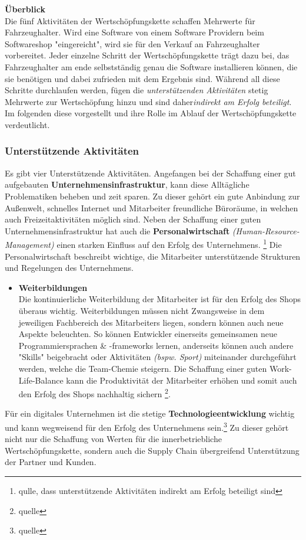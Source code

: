 \textbf{Überblick}\\
Die fünf Aktivitäten der Wertschöpfungskette schaffen Mehrwerte für Fahrzeughalter. Wird eine Software von einem Software Providern beim Softwareshop "eingereicht", wird sie für den Verkauf an Fahrzeughalter vorbereitet. Jeder einzelne Schritt der Wertschöpfungskette trägt dazu bei, das Fahrzeughalter am ende selbstständig genau die Software installieren können, die sie benötigen und dabei zufrieden mit dem Ergebnis sind. Während all diese Schritte durchlaufen werden, fügen die \textit{unterstützenden Aktivitäten} stetig Mehrwerte zur Wertschöpfung hinzu und sind daher\textit{indirekt am Erfolg beteiligt}. Im folgenden diese vorgestellt und ihre Rolle im Ablauf der Wertschöpfungskette verdeutlicht.

\subsubsection{Unterstützende Aktivitäten}\label{unterstd_activities}
Es gibt vier Unterstützende Aktivitäten. Angefangen bei der Schaffung einer gut aufgebauten \textbf{Unternehmensinfrastruktur}, kann diese Alltägliche Problematiken beheben und zeit sparen. Zu dieser gehört ein gute Anbindung zur Außenwelt, schnelles Internet und Mitarbeiter freundliche Büroräume, in welchen auch Freizeitaktivitäten möglich sind. Neben der Schaffung einer guten Unternehmensinfrastruktur hat auch die \textbf{Personalwirtschaft} \textit{(Human-Resource-Management)} einen starken Einfluss auf den Erfolg des Unternehmens. \footnote{qulle, dass unterstützende Aktivitäten indirekt am Erfolg beteiligt sind} Die Personalwirtschaft beschreibt wichtige, die Mitarbeiter unterstützende Strukturen und Regelungen des Unternehmens.
\begin{itemize}
	\item[] \hspace{-0.6cm} \textbf{Weiterbildungen}\\
	Die kontinuierliche Weiterbildung der Mitarbeiter ist für den Erfolg des Shops überaus wichtig. Weiterbildungen müssen nicht Zwangsweise in dem jeweiligen Fachbereich des Mitarbeiters liegen, sondern können auch neue Aspekte beleuchten. So können Entwickler einerseits gemeinsamen neue Programmiersprachen \& -frameworks lernen, anderseits können auch andere "Skills" beigebracht oder Aktivitäten \textit{(bspw. Sport)} miteinander durchgeführt werden, welche die Team-Chemie steigern. Die Schaffung einer guten Work-Life-Balance kann die Produktivität der Mitarbeiter erhöhen und somit auch den Erfolg des Shops nachhaltig sichern \footnote{quelle}.
	
\end{itemize}
Für ein digitales Unternehmen ist die stetige \textbf{Technologieentwicklung} wichtig und kann wegweisend für den Erfolg des Unternehmens sein.\footnote{quelle} Zu dieser gehört nicht nur die Schaffung von Werten für die innerbetriebliche Wertschöpfungskette, sondern auch die Supply Chain übergreifend Unterstützung der Partner und Kunden.

